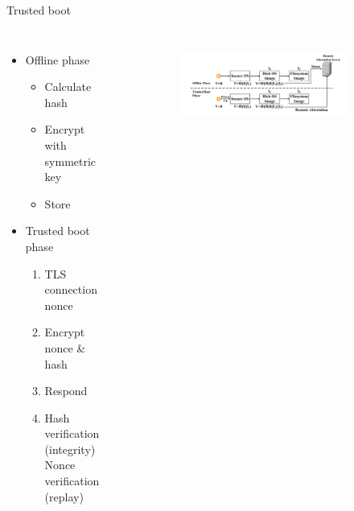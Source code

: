 \documentclass[]{beamer}
\begin{document}
\begin{frame}{Trusted boot}
\begin{columns}
\begin{itemize}
\item Offline phase \begin{itemize}
\item Calculate hash
\item Encrypt with symmetric key
\item Store
\end{itemize}
\item Trusted boot phase \begin{enumerate}
\item TLS connection nonce
\item Encrypt nonce \& hash
\item Respond
\item Hash verification (integrity) \\ Nonce verification (replay)
\end{enumerate}
\end{itemize}
\begin{figure}
\centering
   \begin{subfigure}[b]{1\textwidth}
   \includegraphics[width=1\textwidth]{Pictures/trusted_boot.png}
\end{subfigure}


\end{figure}
\end{columns}
\end{frame}
\end{document}

